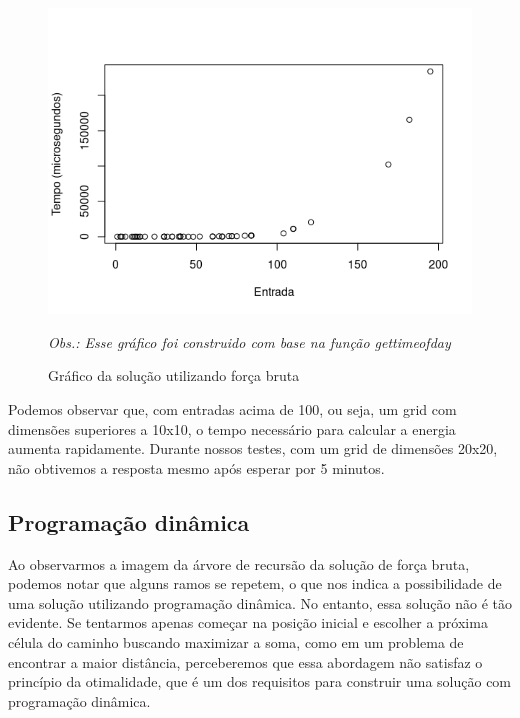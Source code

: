 \documentclass[12pt]{article}
\begin{document}
                \begin{figure}[h]
                    \centering
                    \includegraphics[width=0.9\linewidth]{Figuras/graficoForcaBruta.png}\\
                    \caption{Gráfico da solução utilizando força bruta}
                    \label{fig:grafico forca bruta}
                    \textit{Obs.: Esse gráfico foi construido com base na função gettimeofday}
                \end{figure}

                Podemos observar que, com entradas acima de 100, ou seja, um grid com dimensões 
                superiores a 10x10, o tempo necessário para calcular a energia aumenta rapidamente. 
                Durante nossos testes, com um grid de dimensões 20x20, não obtivemos a resposta 
                mesmo após esperar por 5 minutos.
        \newpage
        \subsection{Programação dinâmica}
            Ao observarmos a imagem da árvore de recursão da solução de força bruta, podemos notar 
            que alguns ramos se repetem, o que nos indica a possibilidade de uma solução utilizando 
            programação dinâmica. No entanto, essa solução não é tão evidente. Se tentarmos apenas 
            começar na posição inicial e escolher a próxima célula do caminho buscando maximizar a 
            soma, como em um problema de encontrar a maior distância, perceberemos que essa abordagem 
            não satisfaz o princípio da otimalidade, que é um dos requisitos para construir uma 
            solução com programação dinâmica.
\end{document}

